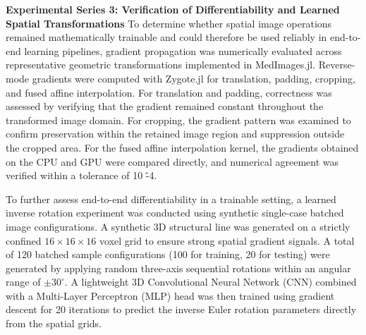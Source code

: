 \documentclass[a4paper,10pt,preprint]{elsarticle}
\begin{document}
\textbf{Experimental Series 3: Verification of Differentiability and Learned Spatial Transformations}
To determine whether spatial image operations remained mathematically trainable and could therefore be used reliably in end-to-end learning pipelines, gradient propagation was numerically evaluated across representative geometric transformations implemented in MedImages.jl. Reverse-mode gradients were computed with Zygote.jl for translation, padding, cropping, and fused affine interpolation. For translation and padding, correctness was assessed by verifying that the gradient remained constant throughout the transformed image domain. For cropping, the gradient pattern was examined to confirm preservation within the retained image region and suppression outside the cropped area. For the fused affine interpolation kernel, the gradients obtained on the CPU and GPU were compared directly, and numerical agreement was verified within a tolerance of 10 \^ -4. 

To further assess end-to-end differentiability in a trainable setting, a learned inverse rotation experiment was conducted using synthetic single-case batched image configurations. A synthetic 3D structural line was generated on a strictly confined $16 \times 16 \times 16$ voxel grid to ensure strong spatial gradient signals. A total of 120 batched sample configurations (100 for training, 20 for testing) were generated by applying random three-axis sequential rotations within an angular range of $\pm 30^{\circ}$. A lightweight 3D Convolutional Neural Network (CNN) combined with a Multi-Layer Perceptron (MLP) head was then trained using gradient descent for 20 iterations to predict the inverse Euler rotation parameters directly from the spatial grids.
\end{document}
